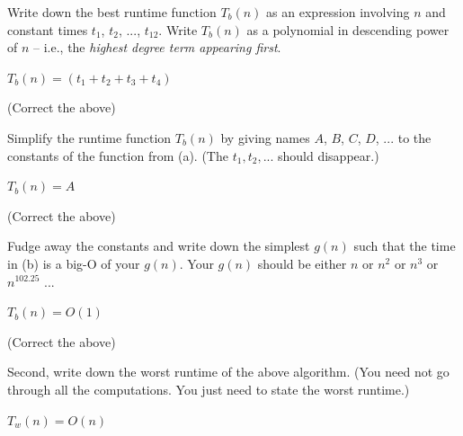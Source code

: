 \nextq
Write down the best runtime function $T_b(n)$ as an expression involving
$n$ and constant times
$t_{1}$, $t_{2}$, ..., $t_{12}$.
Write $T_b(n)$ as a polynomial in descending power of $n$ -- i.e.,
the \textit{highest degree term appearing first}.
\\
\ANSWER
\begin{answerlong}
$T_b(n) = (t_1 + t_2 + t_3 + t_4)$
\end{answerlong}
(Correct the above)

\nextq
Simplify the runtime function $T_b(n)$
by giving names $A$, $B$, $C$, $D$, ...
to the constants of the function from (a). (The $t_1, t_2, ...$ should
disappear.)
\\
\ANSWER
\begin{answerlong}
$T_b(n) = A$
\end{answerlong}
(Correct the above)

\nextq
Fudge away the constants and write down the simplest $g(n)$ such
that the time in (b) is a big-O of your $g(n)$.
Your $g(n)$ should be either $n$ or $n^2$ or $n^3$ or $n^{102.25}$ ...
\\
\ANSWER
\begin{answerlong}
$T_b(n) = O(1)$
\end{answerlong}
(Correct the above)

\nextq
Second, write down the worst runtime of the above algorithm.
(You need not go through all the computations. You just need to state
the worst runtime.)
\\
\ANSWER
\begin{answerlong}
$T_w(n) = O(n)$
\end{answerlong}


